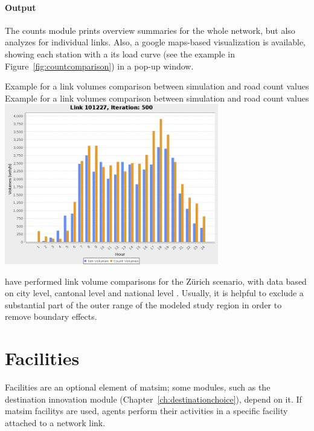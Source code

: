 \paragraph{Output}
The counts module prints overview summaries for the whole network, but also analyzes for individual links. Also, a google maps-based visualization is available, showing each station with a its load curve (see the example in Figure~\ref{fig:countcomparison}) in a pop-up window.

\createfigure%
{Example for a link volumes comparison between simulation and road count values}%
{Example for a link volumes comparison between simulation and road count values}%
{\label{fig:countcomparison}}%
{\includegraphics[width=0.7\textwidth, angle=0]{extending/figures/link101227.png}}%
{}


\citet[][]{BalmerEtAl_ResRep_bdktzrh_2009} have performed link volume comparisons for the Zürich scenario, with data based on city level, cantonal level and national level \citep[][]{ASTRA_Webpage_2006}.
Usually, it is helpful to exclude a substantial part of the outer range of the 
modeled study region in order to remove boundary effects.


\section{Facilities}
\label{sec:extending-facilities}
Facilities are an optional element of \gls{matsim}; some \glspl{module}, such as the destination innovation module (Chapter~\ref{ch:destinationchoice}), depend on it.
If \gls{matsim} \glspl{facility} are used, agents perform their activities in a specific \gls{facility} attached to a network link. 

